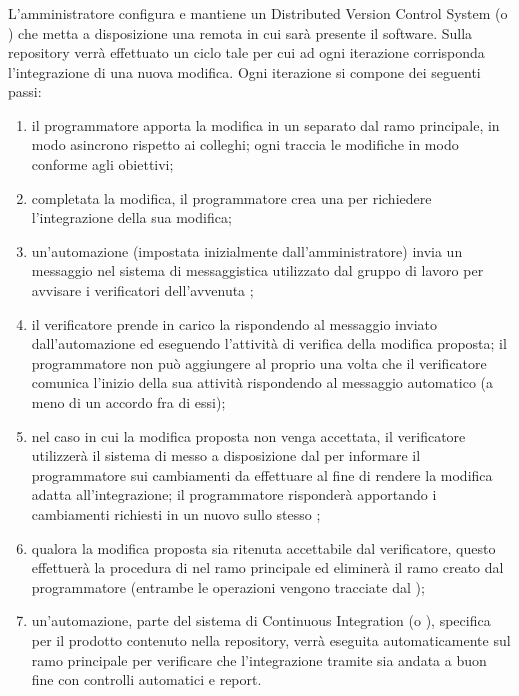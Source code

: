 \documentclass[]{article}
\begin{document}
			\subsubsection{}
			L'amministratore configura e mantiene un Distributed Version Control System (o ) che metta a disposizione una  remota in cui sarà presente il software. Sulla repository verrà effettuato un ciclo tale per cui ad ogni iterazione corrisponda l'integrazione di una nuova modifica. Ogni iterazione si compone dei seguenti passi:
			\begin{enumerate}
			\item il programmatore apporta la modifica in un  separato dal ramo principale, in modo asincrono rispetto ai colleghi; ogni  traccia le modifiche in modo conforme agli obiettivi;
			\item completata la modifica, il programmatore crea una  per richiedere l'integrazione della sua modifica;
			\item un'automazione (impostata inizialmente dall'amministratore) invia un messaggio nel sistema di messaggistica utilizzato dal gruppo di lavoro per avvisare i verificatori dell'avvenuta ;
			\item il verificatore prende in carico la  rispondendo al messaggio inviato dall'automazione ed eseguendo l'attività di verifica della modifica proposta; il programmatore non può aggiungere  al proprio  una volta che il verificatore comunica l'inizio della sua attività rispondendo al messaggio automatico (a meno di un accordo fra di essi);
			\item nel caso in cui la modifica proposta non venga accettata, il verificatore utilizzerà il sistema di  messo a disposizione dal  per informare il programmatore sui cambiamenti da effettuare al fine di rendere la modifica adatta all'integrazione; il programmatore risponderà apportando i cambiamenti richiesti in un nuovo  sullo stesso ;
			\item qualora la modifica proposta sia ritenuta accettabile dal verificatore, questo effettuerà la procedura di  nel ramo principale ed eliminerà il ramo creato dal programmatore (entrambe le operazioni vengono tracciate dal );
			\item un'automazione, parte del sistema di Continuous Integration (o ), specifica per il prodotto contenuto nella repository, verrà eseguita automaticamente sul ramo principale per verificare che l'integrazione tramite  sia andata a buon fine con controlli automatici e report.
			\end{enumerate}
\end{document}
